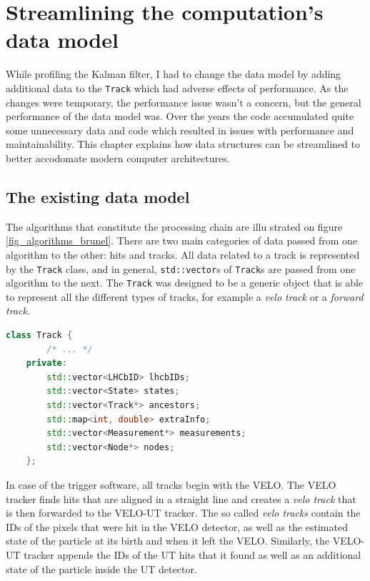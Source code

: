 \documentclass[12pt]{article}
\newcommand{\code}[1]{\texttt{#1}}
\begin{document}
\newpage
\section{Streamlining the computation's data model}

While profiling the Kalman filter, I had to change the data model by adding additional data to the \code{Track} which had adverse effects of performance. As the changes were temporary, the performance issue wasn't a concern, but the general performance of the data model was. Over the years the code accumulated quite some unnecessary data and code which resulted in issues with performance and maintainability. This chapter explains how data structures can be streamlined to better accodomate modern computer architectures.

\subsection{The existing data model}

The algorithms that constitute the processing chain are illu strated on figure \ref{fig_algorithms_brunel}. There are two main categories of data passed from one algorithm to the other: hits and tracks. All data related to a track is represented by the \code{Track} class, and in general, \code{std::vector}s of \code{Track}s are passed from one algorithm to the next. The \code{Track} was designed to be a generic object that is able to represent all the different types of tracks, for example a \textit{velo track} or a \textit{forward track}.

\begin{lstlisting}[language=C++,caption=Simplified code of the \code{Track} class.,label=lst_datamodel_trackv2_simple
]
	class Track {
		/* ... */
	private:
		std::vector<LHCbID> lhcbIDs;
		std::vector<State> states;
		std::vector<Track*> ancestors;
		std::map<int, double> extraInfo;
		std::vector<Measurement*> measurements;
		std::vector<Node*> nodes;
	};	
\end{lstlisting}

In case of the trigger software, all tracks begin with the VELO. The VELO tracker finds hits that are aligned in a straight line and creates a \textit{velo track} that is then forwarded to the VELO-UT tracker. The so called \textit{velo tracks} contain the IDs of the pixels that were hit in the VELO detector, as well as the estimated state of the particle at its birth and when it left the VELO. Similarly, the VELO-UT tracker appends the IDs of the UT hits that it found as well as an additional state of the particle inside the UT detector.
\end{document}
